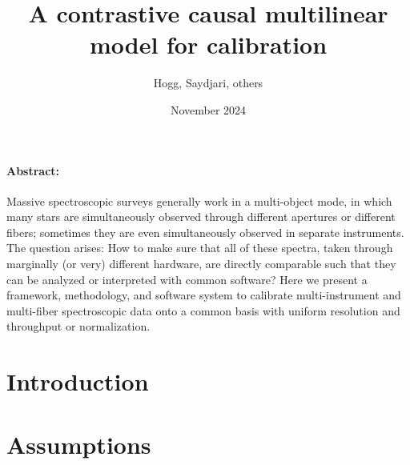 \documentclass{article}
\title{\bfseries%
A contrastive causal multilinear model for calibration}
\author{Hogg, Saydjari, others}
\date{November 2024}
\begin{document}
\maketitle

\paragraph{Abstract:}
Massive spectroscopic surveys generally work in a multi-object mode, in which many stars are simultaneously observed
through different apertures or different fibers; sometimes they are even simultaneously observed in separate instruments.
The question arises:
How to make sure that all of these spectra, taken through marginally (or very) different hardware,
are directly comparable such that they can be analyzed or interpreted with common software?
Here we present a framework, methodology, and software system to calibrate multi-instrument and multi-fiber spectroscopic
data onto a common basis with uniform resolution and throughput or normalization.

\section{Introduction}

\section{Assumptions}
\end{document}
